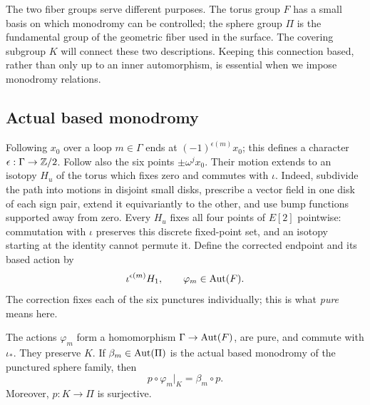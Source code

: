 The two fiber groups serve different purposes. The torus group $F$ has a
small basis on which monodromy can be controlled; the sphere group $\Pi$
is the fundamental group of the geometric fiber used in the surface.
The covering subgroup $K$ will connect these two descriptions. Keeping
this connection based, rather than only up to an inner automorphism,
is essential when we impose monodromy relations.

\subsection{Actual based monodromy}

Following $x_0$ over a loop $m\in\Gamma$ ends at
$(-1)^{\epsilon(m)}x_0$; this defines a character
$\epsilon:\Gamma\to\mathbb Z/2$.  Follow also the six points
$\pm\omega^j x_0$.  Their motion extends to an isotopy $H_u$ of the
torus which fixes zero and commutes with $\iota$.  Indeed, subdivide
the path into motions in disjoint small disks, prescribe a vector
field in one disk of each sign pair, extend it equivariantly to the
other, and use bump functions supported away from zero. Every $H_u$
fixes all four points of $E[2]$ pointwise: commutation with $\iota$
preserves this discrete fixed-point set, and an isotopy starting at the
identity cannot permute it. Define the
corrected endpoint and its based action by
\begin{equation}\label{eq:corrected-monodromy}
 \iota^{\epsilon(m)}H_1,
 \qquad \varphi_m\in\operatorname{Aut}(F).
\end{equation}
The correction fixes each of the six punctures individually; this
is what \emph{pure} means here.

\begin{proposition}\label{prop:based-monodromy}
The actions $\varphi_m$ form a homomorphism
$\Gamma\to\operatorname{Aut}(F)$, are pure, and commute with $\iota_*$.
They preserve $K$.  If $\beta_m\in\operatorname{Aut}(\Pi)$ is the actual based
monodromy of the punctured sphere family, then
\begin{equation}\label{eq:actual-monodromy-square}
 p\circ\varphi_m|_K=\beta_m\circ p.
\end{equation}
Moreover, $p:K\to\Pi$ is surjective.
\end{proposition}

